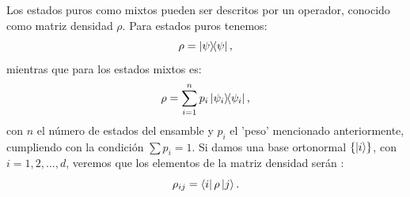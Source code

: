 \documentclass[letterpaper,12pt]{thesisECFM}
\theoremstyle{plain}
\theoremstyle{definition}
\theoremstyle{definition}
\theoremstyle{remark}
\newcommand{\1}{\mathbb{1}}
\begin{document}
Los estados puros como mixtos pueden ser descritos por un operador,
conocido como matriz densidad $\rho$. Para estados puros tenemos:
    \begin{equation}
        \label{ec:dens_puros}
        \rho = \ketbra{\psi},
    \end{equation}
mientras que para los estados mixtos es:
\begin{equation}
\label{dens_mixtos}
    \rho = \sum_{i=1}^{n} p_i \ketbra{\psi_i},
\end{equation}
con $n$ el número de estados del ensamble y $p_i$ el 'peso' mencionado
anteriormente, cumpliendo con la condición $\sum p_i =1$.
Si damos una base ortonormal $\{\ket{i}\}$, con $i=1,2,...,d$, veremos que los elementos de la
matriz densidad serán \cite{princip_quantum}:
\begin{equation}
    \label{eq:rho_ij}
    \rho_{ij} = \bra{i} \rho \ket{j}.
\end{equation}
   
\end{document}
